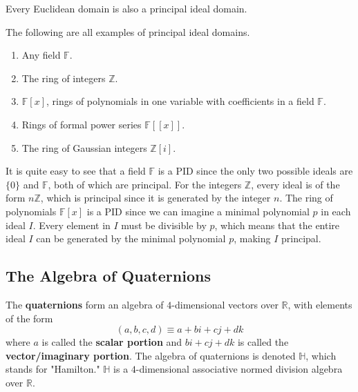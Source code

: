 \documentclass{article}
\begin{document}
    \begin{proposition}
      Every Euclidean domain is also a principal ideal domain. 
    \end{proposition}

    \begin{example}
      The following are all examples of principal ideal domains. 
      \begin{enumerate}
        \item Any field $\mathbb{F}$. 
        \item The ring of integers $\mathbb{Z}$. 
        \item $\mathbb{F}[x]$, rings of polynomials in one variable with coefficients in a field $\mathbb{F}$. 
        \item Rings of formal power series $\mathbb{F}[[x]]$. 
        \item The ring of Gaussian integers $\mathbb{Z}[i]$. 
      \end{enumerate}
    \end{example}

    It is quite easy to see that a field $\mathbb{F}$ is a PID since the only two possible ideals are $\{0\}$ and $\mathbb{F}$, both of which are principal. For the integers $\mathbb{Z}$, every ideal is of the form $n\mathbb{Z}$, which is principal since it is generated by the integer $n$. The ring of polynomials $\mathbb{F}[x]$ is a PID since we can imagine a minimal polynomial $p$ in each ideal $I$. Every element in $I$ must be divisible by $p$, which means that the entire ideal $I$ can be generated by the minimal polynomial $p$, making $I$ principal. 

  \subsection{The Algebra of Quaternions}

    \begin{definition}
      The \textbf{quaternions} form an algebra of $4$-dimensional vectors over $\mathbb{R}$, with elements of the form
      \begin{equation}
        (a, b, c, d) \equiv a + bi + cj + dk
      \end{equation}
      where $a$ is called the \textbf{scalar portion} and $bi + cj + dk$ is called the \textbf{vector/imaginary portion}. The algebra of quaternions is denoted $\mathbb{H}$, which stands for "Hamilton." $\mathbb{H}$ is a $4$-dimensional associative normed division algebra over $\mathbb{R}$. 
    \end{definition}
\end{document}

